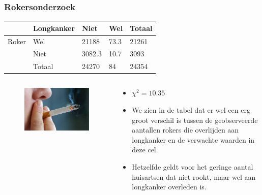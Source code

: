 \documentclass{beamer}
\begin{document}
\begin{frame}
  \frametitle{Rokersonderzoek}
\begin{table}[h]
\begin{tabular}{@{}lllll@{}}
\toprule
      & \textbf{Longkanker} & \textbf{Niet} & \textbf{Wel} & \textbf{Totaal} \\ \midrule
Roker & Wel                 & 21188         & 73.3         & 21261           \\
      & Niet                & 3082.3        & 10.7         & 3093            \\
      & Totaal              & 24270         & 84           & 24354           \\ \bottomrule
\end{tabular}
\end{table}

\begin{columns}
  \begin{column}{0.3 \textwidth}

  \begin{figure}
    \centering
      \includegraphics[width=1.00\textwidth]{img/les-6-smoking.jpg}
  \end{figure}

  \end{column}
  \begin{column}{0.7 \textwidth}

  \begin{itemize}
    \item $\chi^{2} = 10.35$
    \item We zien in de tabel  dat er wel een erg groot verschil is tussen de geobserveerde aantallen rokers die overlijden aan longkanker en de verwachte waarden in deze cel.
    \item Hetzelfde geldt voor het geringe aantal huisartsen dat niet rookt, maar wel aan longkanker overleden is.
  \end{itemize}
  \end{column}
\end{columns}
\end{frame}
\end{document}

